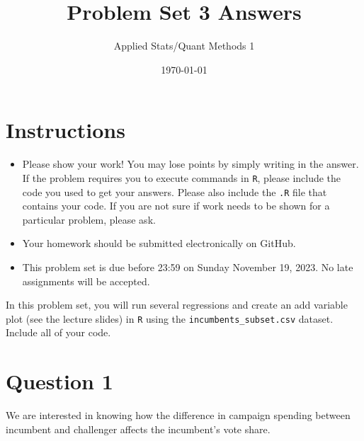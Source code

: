 \documentclass[12pt,letterpaper]{article}
\title{Problem Set 3 Answers}
\date{\today}
\author{Applied Stats/Quant Methods 1}
\begin{document}
	\maketitle
	\section*{Instructions}
	\begin{itemize}
		\item Please show your work! You may lose points by simply writing in the answer. If the problem requires you to execute commands in \texttt{R}, please include the code you used to get your answers. Please also include the \texttt{.R} file that contains your code. If you are not sure if work needs to be shown for a particular problem, please ask.
	\item Your homework should be submitted electronically on GitHub.
	\item This problem set is due before 23:59 on Sunday November 19, 2023. No late assignments will be accepted.

	\end{itemize}

		\vspace{.25cm}
	
\noindent In this problem set, you will run several regressions and create an add variable plot (see the lecture slides) in \texttt{R} using the \texttt{incumbents\_subset.csv} dataset. Include all of your code.

	\vspace{.5cm}
\section*{Question 1}
\vspace{.25cm}
\noindent We are interested in knowing how the difference in campaign spending between incumbent and challenger affects the incumbent's vote share. 
\end{document}

